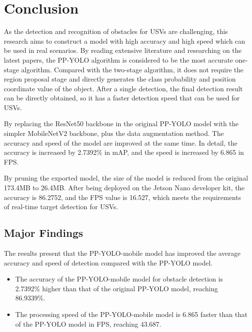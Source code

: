 \documentclass[journal,article,submit,moreauthors,pdftex]{Definitions/mdpi}
\begin{document}
\section{Conclusion}


As the detection and recognition of obstacles for USVs are challenging, this research aims to construct a model with high accuracy and high speed which can be used in real scenarios. By reading extensive literature and researching on the latest papers, the PP-YOLO algorithm is considered to be the most accurate one-stage algorithm. Compared with the two-stage algorithm, it does not require the region proposal stage and directly generates the class probability and position coordinate value of the object. After a single detection, the final detection result can be directly obtained, so it has a faster detection speed that can be used for USVs.

By replacing the ResNet50 backbone in the original PP-YOLO model with the simpler MobileNetV2 backbone, plus the data augmentation method. The accuracy and speed of the model are improved at the same time. In detail, the accuracy is increased by 2.7392\% in mAP, and the speed is increased by 6.865 in FPS.

By pruning the exported model, the size of the model is reduced from the original 173.4MB to 26.4MB. After being deployed on the Jetson Nano developer kit, the accuracy is 86.2752, and the FPS value is 16.527, which meets the requirements of real-time target detection for USVs.

\subsection{Major Findings}
The results present that the PP-YOLO-mobile model has improved the average accuracy and speed of detection compared with the PP-YOLO model.

\begin{itemize}
\item{The accuracy of the PP-YOLO-mobile model for obstacle detection is 2.7392\% higher than that of the original PP-YOLO model, reaching 86.9339\%.}
\end{itemize}

\begin{itemize}
\item{The processing speed of the PP-YOLO-mobile model is 6.865 faster than that of the PP-YOLO model in FPS, reaching 43.687.}

\end{itemize}
\end{document}
